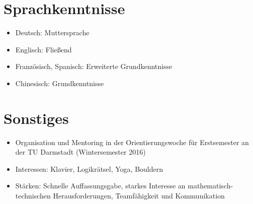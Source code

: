 \documentclass[10pt, letterpaper]{article}
\newenvironment{highlights}{
    \begin{itemize}[
        topsep=0.10 cm,
        parsep=0.10 cm,
        partopsep=0pt,
        itemsep=0pt,
        leftmargin=0.4 cm + 10pt
    ]
}{
    \end{itemize}
} %
\begin{document}
\section{Sprachkenntnisse}

\begin{highlights}
    \item Deutsch: Muttersprache
    \item Englisch: Fließend
    \item Französisch, Spanisch: Erweiterte Grundkenntnisse
    \item Chinesisch: Grundkenntnisse
\end{highlights}

\section{Sonstiges}

\begin{highlights}
    \item Organisation und Mentoring in der Orientierungswoche für Erstsemester an der TU Darmstadt (Wintersemester 2016)
    \item Interessen: Klavier, Logikrätsel, Yoga, Bouldern
    \item Stärken: Schnelle Auffassungsgabe, starkes Interesse an mathematisch-technischen Herausforderungen, Teamfähigkeit und Kommunikation
\end{highlights}
\end{document}
